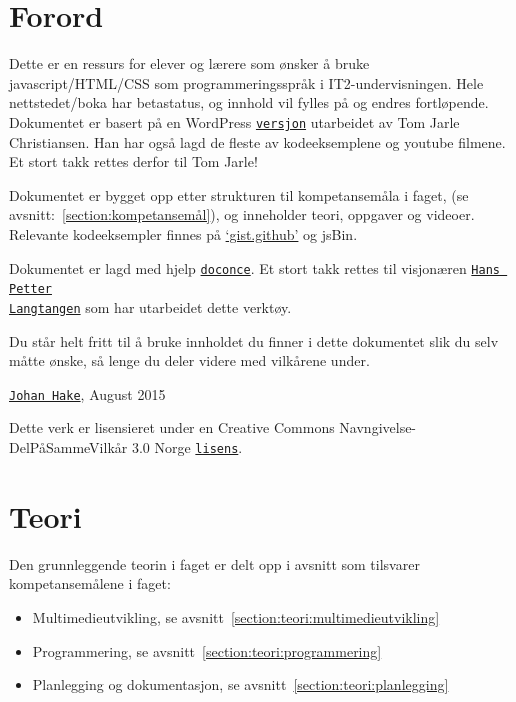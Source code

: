 \documentclass[%
oneside,                 %
final,                   %
12pt]{article}
\begin{document}
\pagebreak

\section{Forord}
\label{section:forord}

Dette er en ressurs for elever og lærere som ønsker å bruke
javascript/HTML/CSS som programmeringsspråk i IT2-undervisningen. Hele
nettstedet/boka har betastatus, og innhold vil fylles på og endres
fortløpende. Dokumentet er basert på en WordPress
\href{{http://www.fuzzbin.org/IT2}}{\nolinkurl{versjon}} utarbeidet av Tom Jarle
Christiansen. Han har også lagd de fleste av kodeeksemplene og youtube
filmene. Et stort takk rettes derfor til Tom Jarle!

Dokumentet er bygget opp etter strukturen til kompetansemåla i faget,
(se avsnitt:~\ref{section:kompetansemål}), og inneholder teori,
oppgaver og videoer. Relevante kodeeksempler finnes på
\href{{http://gist.github.com/johanhake}}{`gist.github'} og jsBin.

Dokumentet er lagd med hjelp
\href{{http://hplgit.github.io/doconce/doc/web/index.html}}{\nolinkurl{doconce}}.  Et
stort takk rettes til visjonæren \href{{http://hplgit.github.io/homepage/index.html}}{\nolinkurl{Hans Petter
Langtangen}} som har
utarbeidet dette verktøy.


Du står helt fritt til å bruke innholdet du finner i dette dokumentet
slik du selv måtte ønske, så lenge du deler videre med vilkårene
under. 

\href{{mailto:johan.hake@gmail.com}}{\nolinkurl{Johan Hake}}, August 2015

Dette verk er lisensieret under en Creative Commons
Navngivelse-DelPåSammeVilkår 3.0 Norge
\href{{http://creativecommons.org/licenses/by-sa/3.0/no/}}{\nolinkurl{lisens}}.


\pagebreak

\section{Teori}

Den grunnleggende teorin i faget er delt opp i avsnitt som tilsvarer
kompetansemålene i faget:

\begin{itemize}
\item Multimedieutvikling, se avsnitt~\ref{section:teori:multimedieutvikling}

\item Programmering, se avsnitt~\ref{section:teori:programmering}

\item Planlegging og dokumentasjon, se avsnitt~\ref{section:teori:planlegging}
\end{itemize}
\end{document}
